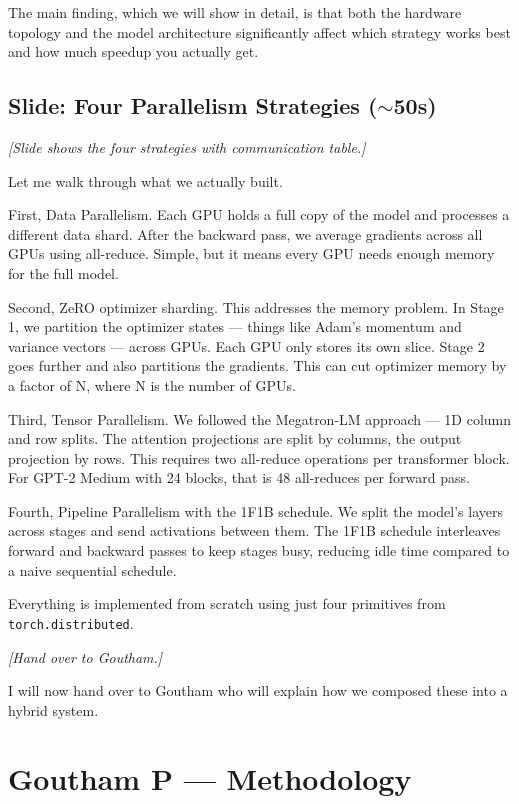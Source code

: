 \documentclass[11pt, a4paper]{article}
\begin{document}
The main finding, which we will show in detail, is that both the hardware topology and the model architecture significantly affect which strategy works best and how much speedup you actually get.

\subsection{Slide: Four Parallelism Strategies ($\sim$50s)}
\textit{[Slide shows the four strategies with communication table.]}

Let me walk through what we actually built.

First, Data Parallelism. Each GPU holds a full copy of the model and processes a different data shard. After the backward pass, we average gradients across all GPUs using all-reduce. Simple, but it means every GPU needs enough memory for the full model.

Second, ZeRO optimizer sharding. This addresses the memory problem. In Stage 1, we partition the optimizer states --- things like Adam's momentum and variance vectors --- across GPUs. Each GPU only stores its own slice. Stage 2 goes further and also partitions the gradients. This can cut optimizer memory by a factor of N, where N is the number of GPUs.

Third, Tensor Parallelism. We followed the Megatron-LM approach --- 1D column and row splits. The attention projections are split by columns, the output projection by rows. This requires two all-reduce operations per transformer block. For GPT-2 Medium with 24 blocks, that is 48 all-reduces per forward pass.

Fourth, Pipeline Parallelism with the 1F1B schedule. We split the model's layers across stages and send activations between them. The 1F1B schedule interleaves forward and backward passes to keep stages busy, reducing idle time compared to a naive sequential schedule.

Everything is implemented from scratch using just four primitives from \texttt{torch.distributed}.

\textit{[Hand over to Goutham.]}

I will now hand over to Goutham who will explain how we composed these into a hybrid system.

\section{Goutham P --- Methodology}
\end{document}
